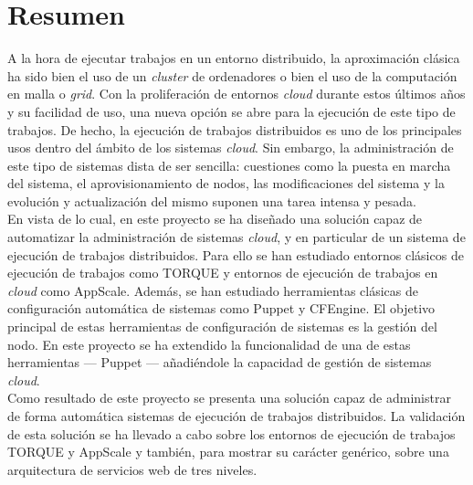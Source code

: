 \chapter{Resumen}
\label{cap:resumen}


A la hora de ejecutar trabajos en un entorno distribuido, la aproximación clásica ha sido bien el uso de un \emph{cluster} de ordenadores o bien el uso de la computación en malla o \emph{grid}. Con la proliferación de entornos \emph{cloud} durante estos últimos años y su facilidad de uso, una nueva opción se abre para la ejecución de este tipo de trabajos. De hecho, la ejecución de trabajos distribuidos es uno de los principales usos dentro del ámbito de los sistemas \emph{cloud}. Sin embargo, la administración de este tipo de sistemas dista de ser sencilla: cuestiones como la puesta en marcha del sistema, el aprovisionamiento de nodos, las modificaciones del sistema y la evolución y actualización del mismo suponen una tarea intensa y pesada.\\

En vista de lo cual, en este proyecto se ha diseñado una solución capaz de automatizar la administración de sistemas \emph{cloud}, y en particular de un sistema de ejecución de trabajos distribuidos. Para ello se han estudiado entornos clásicos de ejecución de trabajos como TORQUE y entornos de ejecución de trabajos en \emph{cloud} como AppScale. Además, se han estudiado herramientas clásicas de configuración automática de sistemas como Puppet y CFEngine. El objetivo principal de estas herramientas de configuración de sistemas es la gestión del nodo. En este proyecto se ha extendido la funcionalidad de una de estas herramientas --- Puppet --- añadiéndole la capacidad de gestión de sistemas \emph{cloud}.\\

Como resultado de este proyecto se presenta una solución capaz de administrar de forma automática sistemas de ejecución de trabajos distribuidos. La validación de esta solución se ha llevado a cabo sobre los entornos de ejecución de trabajos TORQUE y AppScale y también, para mostrar su carácter genérico, sobre una arquitectura de servicios web de tres niveles.
